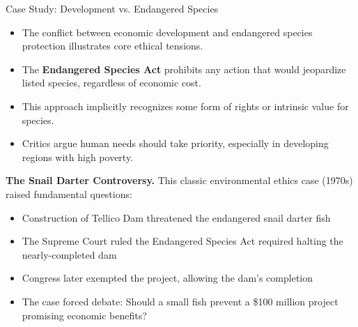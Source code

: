 \documentclass{beamer}
\begin{document}
	\begin{frame}{Case Study: Development vs. Endangered Species}
		\begin{itemize}
			\item The conflict between economic development and endangered species protection illustrates core ethical tensions.
			\item The\textbf{ Endangered Species Act} prohibits any action that would jeopardize listed species, regardless of economic cost.
			\item This approach implicitly recognizes some form of rights or intrinsic value for species.
			\item Critics argue human needs should take priority, especially in developing regions with high poverty.
		\end{itemize}
		
		\begin{example}
			\scriptsize
			\textbf{The Snail Darter Controversy.} This classic environmental ethics case (1970s) raised fundamental questions:
			\begin{itemize}
				\item Construction of Tellico Dam threatened the endangered snail darter fish
				\item The Supreme Court ruled the Endangered Species Act required halting the nearly-completed dam
				\item Congress later exempted the project, allowing the dam's completion
				\item The case forced debate: Should a small fish prevent a \$100 million project promising economic benefits?
			\end{itemize}
		\end{example}
	\end{frame}
	
\end{document}
